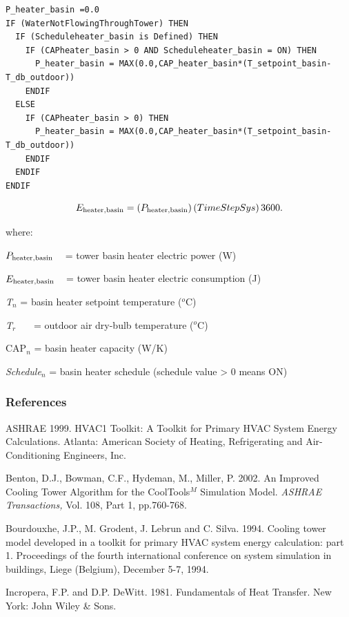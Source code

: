 \begin{lstlisting}
P_heater_basin =0.0
IF (WaterNotFlowingThroughTower) THEN
  IF (Scheduleheater_basin is Defined) THEN
    IF (CAPheater_basin > 0 AND Scheduleheater_basin = ON) THEN
      P_heater_basin = MAX(0.0,CAP_heater_basin*(T_setpoint_basin-T_db_outdoor))
    ENDIF
  ELSE
    IF (CAPheater_basin > 0) THEN
      P_heater_basin = MAX(0.0,CAP_heater_basin*(T_setpoint_basin-T_db_outdoor))
    ENDIF
  ENDIF
ENDIF
\end{lstlisting}

\begin{equation}
{E_{{\rm{heater,basin}}}} = \left( {{P_{{\rm{heater,basin}}}}} \right)\left( {TimeStepSys} \right){\rm{3600}}{\rm{.}}
\end{equation}

where:

\({P_{{\rm{heater,basin}}}}\) ~ = tower basin heater electric power (W)

\({E_{{\rm{heater,basin}}}}\) ~ = tower basin heater electric consumption (J)

\emph{T\(_{n}\)} = basin heater setpoint temperature (\(^{o}\)C)

\emph{T\(_{r}\)}~~~ = outdoor air dry-bulb temperature (\(^{o}\)C)

CAP\emph{\(_{n}\)} = basin heater capacity (W/K)

\emph{Schedule\(_{n}\)} = basin heater schedule (schedule value \textgreater{} 0 means ON)

\subsubsection{References}\label{references-1-005}

ASHRAE 1999. HVAC1 Toolkit: A Toolkit for Primary HVAC System Energy Calculations. Atlanta: American Society of Heating, Refrigerating and Air-Conditioning Engineers, Inc.

Benton, D.J., Bowman, C.F., Hydeman, M., Miller, P. 2002. An Improved Cooling Tower Algorithm for the CoolTools\(^{M}\) Simulation Model. \emph{ASHRAE Transactions,} Vol. 108, Part 1, pp.760-768.

Bourdouxhe, J.P., M. Grodent, J. Lebrun and C. Silva. 1994. Cooling tower model developed in a toolkit for primary HVAC system energy calculation: part 1. Proceedings of the fourth international conference on system simulation in buildings, Liege (Belgium), December 5-7, 1994.

Incropera, F.P. and D.P. DeWitt. 1981. Fundamentals of Heat Transfer. New York: John Wiley \& Sons.

